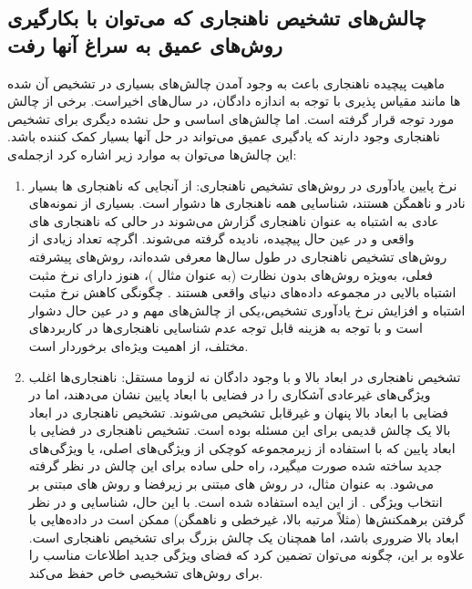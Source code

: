 \documentclass[12pt,a4paper]{report}
\begin{document}
\subsection{چالش‌های تشخیص ناهنجاری که می‌توان با بکارگیری روش‌های عمیق به سراغ آنها رفت }
ماهیت پیچیده ناهنجاری باعث به وجود آمدن چالش‌های بسیاری در تشخیص آن شده است. برخی از چالش‌‎ها مانند مقیاس پذیری با توجه به اندازه دادگان، در سال‌های اخیر مورد توجه قرار گرفته است. اما چالش‌های اساسی و حل نشده دیگری برای تشخیص ناهنجاری وجود دارند که یادگیری عمیق می‌تواند در حل آنها بسیار کمک کننده باشد. ازجمله‌‌‌‌‌‌‌‌‌‌ی ‎این چالش‌ها می‌توان به موارد زیر اشاره کرد:
\begin{enumerate}
\item{
	نرخ پایین یادآوری در روش‌های تشخیص ناهنجاری:
از آنجایی که ناهنجاری ها بسیار نادر و ناهمگن هستند، شناسایی همه ناهنجاری ها دشوار است. بسیاری از نمونه‌های عادی به اشتباه به عنوان ناهنجاری گزارش می‌شوند در حالی که ناهنجاری های واقعی و در عین حال پیچیده،‌ نادیده گرفته می‌شوند. اگرچه تعداد زیادی از روش‌های تشخیص ناهنجاری در طول سال‌ها معرفی شده‌اند، روش‌های پیشرفته فعلی، به‌ویژه روش‌های بدون نظارت (به عنوان مثال \cite{Breunig2000LOFID})، هنوز دارای نرخ مثبت اشتباه بالایی در مجموعه داده‌های دنیای واقعی هستند \cite{pang2019deep}. چگونگی کاهش نرخ مثبت اشتباه و افزایش نرخ یادآوری تشخیص،‌یکی از چالش‌های مهم و در عین حال دشوار است و با توجه به هزینه قابل توجه عدم شناسایی ناهنجاری‌ها در کاربرد‌های مختلف، از اهمیت ویژه‌ای برخوردار است.
}

\item {
تشخیص ناهنجاری در ابعاد بالا و با وجود دادگان نه لزوما مستقل:
ناهنجاری‌ها اغلب ویژگی‌های غیرعادی آشکاری را در فضایی با ابعاد پایین نشان می‌دهند، اما در فضایی با ابعاد بالا پنهان و غیرقابل تشخیص می‌شوند. تشخیص ناهنجاری در ابعاد بالا یک چالش قدیمی برای این مسئله بوده است. تشخیص ناهنجاری در فضایی با ابعاد پایین که با استفاده از زیرمجموعه کوچکی از ویژگی‌های اصلی، یا ویژگی‌های جدید ساخته شده صورت میگیرد، راه حلی ساده برای این چالش در نظر گرفته می‌شود. به عنوان مثال، در روش های مبتنی بر زیرفضا \cite{Keller2012HiCSHC, 10.1145/1081870.1081891, 0704e232d4224e549a7832510ea88690, Pevn2016LodaLO} و روش های مبتنی بر انتخاب ویژگی \cite{Pang2018SparseMS, ijcai2017p360, Azmandian2012GPUAcceleratedFS}. از این ایده استفاده شده است. با این حال، شناسایی و در نظر گرفتن برهمکنش‌ها (مثلاً مرتبه بالا، غیرخطی و ناهمگن) \cite{CAO2015167} ممکن است در داده‌هایی  با ابعاد بالا ضروری باشد، اما همچنان یک چالش بزرگ برای تشخیص ناهنجاری است. علاوه بر این، چگونه می‌توان تضمین کرد که فضای ویژگی جدید اطلاعات مناسب را برای روش‌های تشخیصی خاص حفظ می‌کند.
}


\end{enumerate}
\end{document}
